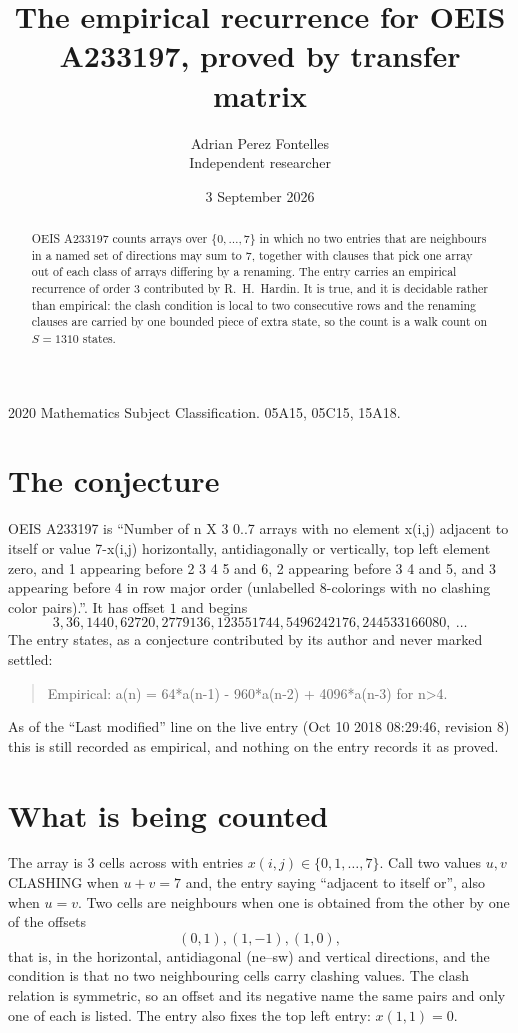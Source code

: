 \documentclass[11pt,a4paper]{article}
\title{The empirical recurrence for OEIS A233197, proved by transfer matrix}
\author{Adrian Perez Fontelles\\ \small Independent researcher}
\date{3 September 2026}
\theoremstyle{plain}
\theoremstyle{definition}
\begin{document}
\maketitle

\begin{abstract}
OEIS A233197 counts arrays over $\{0,\dots,7\}$ in which no two entries that are neighbours in
a named set of directions may sum to $7$, together with clauses that pick one array out of
each class of arrays differing by a renaming. The entry carries an empirical recurrence of
order $3$ contributed by R.~H.~Hardin. It is true, and it is decidable rather than
empirical: the clash condition is local to two consecutive rows and the renaming clauses are
carried by one bounded piece of extra state, so the count is a walk count on $S=1310$ states.
\end{abstract}

\noindent\small 2020 Mathematics Subject Classification. 05A15, 05C15, 15A18.\normalsize

\section{The conjecture}

OEIS A233197 is ``Number of n X 3 0..7 arrays with no element x(i,j) adjacent to itself or value 7-x(i,j) horizontally, antidiagonally or vertically, top left element zero, and 1 appearing before 2 3 4 5 and 6, 2 appearing before 3 4 and 5, and 3 appearing before 4 in row major order (unlabelled 8-colorings with no clashing color pairs).''. It has offset $1$ and begins
\[
3, 36, 1440, 62720, 2779136, 123551744, 5496242176, 244533166080,\ \dots
\]
The entry states, as a conjecture contributed by its author and never marked settled:
\begin{quote}
Empirical: a(n) = 64*a(n-1) - 960*a(n-2) + 4096*a(n-3) for n>4.
\end{quote}
As of the ``Last modified'' line on the live entry (Oct 10 2018 08:29:46, revision 8) this is still
recorded as empirical, and nothing on the entry records it as proved.

\section{What is being counted}

The array is $3$ cells across with entries $x(i,j)\in\{0,1,\dots,7\}$. Call two values $u,v$ CLASHING
when $u+v=7$ and, the entry saying ``adjacent to itself or'', also when $u=v$. Two cells are neighbours when one is obtained from the other by one of
the offsets
\[
(0,1), (1,-1), (1,0),
\]
that is, in the horizontal, antidiagonal (ne--sw) and vertical directions, and the condition is that no two neighbouring cells carry
clashing values. The clash relation is symmetric, so an offset and its negative name the
same pairs and only one of each is listed. The entry also fixes the top left entry: $x(1,1)=0$.
\end{document}
